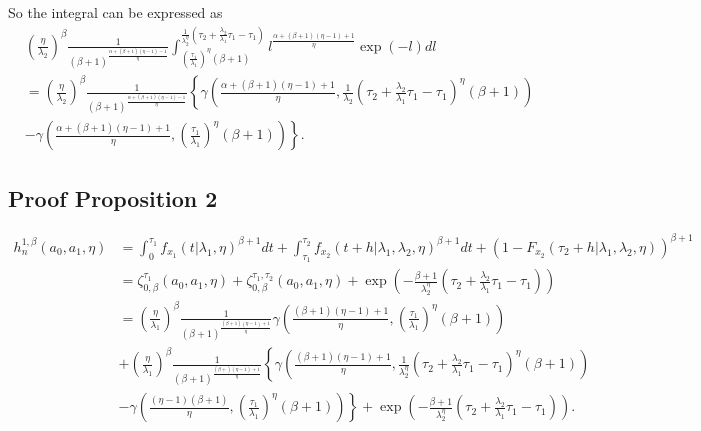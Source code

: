 \documentclass{article}
\begin{document}
So the integral can be expressed as
\begin{align*}
&\left(\frac{\eta}{\lambda_2}\right)^{\beta}\frac{1}{(\beta+1)^{\frac{\alpha+(\beta+1)(\eta-1)-1}{\eta}}}\int_{\left(\frac{\tau_1}{\lambda_1}\right)^{\eta}(\beta+1)}^{\frac{1}{\lambda_2^{\eta}}\left(\tau_2+\frac{\lambda_2}{\lambda_1}\tau_1-\tau_1\right)} l^{\frac{\alpha+(\beta+1)(\eta-1)+1}{\eta}}\exp\left(-l\right) dl 
\\
&=\left(\frac{\eta}{\lambda_2}\right)^{\beta}\frac{1}{(\beta+1)^{\frac{\alpha+(\beta+1)(\eta-1)-1}{\eta}}} \left\{ \gamma\left(\frac{\alpha+(\beta+1)(\eta-1)+1}{\eta},\frac{1}{\lambda_2}\left(\tau_2+\frac{\lambda_2}{\lambda_1}\tau_1-\tau_1\right) ^{\eta}(\beta+1)\right) \right.
\\
& \left.-\gamma\left(\frac{\alpha+(\beta+1)(\eta-1)+1}{\eta},\left(\frac{\tau_1}{\lambda_1}\right)^{\eta}(\beta+1)\right)\right\}.
\end{align*}

\subsection{Proof Proposition 2}
\begin{align*}
h_{n}^{1,\beta}(a_0,a_1,\eta)&=\int_0^{\tau_1}f_{x_1}\left(t|\lambda_1,\eta\right)^{\beta+1}dt+\int_{\tau_1}^{\tau_2}f_{x_2}\left(t+h|\lambda_1,\lambda_2,\eta\right)^{\beta+1}dt+\left(1- F_{x_2}\left(\tau_2+h|\lambda_1,\lambda_2,\eta\right)\right)^{\beta+1}
\\
&=\zeta_{0,\beta}^{\tau_1}(a_0,a_1,\eta)+\zeta_{0,\beta}^{\tau_1,\tau_2}(a_0,a_1,\eta)+\exp\left(-\frac{\beta+1}{\lambda_2^{\eta}}\left(\tau_2+\frac{\lambda_2}{\lambda_1}\tau_1-\tau_1\right)\right)
\\
&=\left(\frac{\eta}{\lambda_1}\right)^{\beta}\frac{1}{(\beta+1)^{\frac{(\beta+1)(\eta-1)+1}{\eta}}} \gamma\left(\frac{(\beta+1)(\eta-1)+1}{\eta}, \left(\frac{\tau_1}{\lambda_1}\right)^{\eta}(\beta+1)\right)
\\
&+\left(\frac{\eta}{\lambda_1}\right)^{\beta}\frac{1}{(\beta+1)^{\frac{(\beta+)(\eta-1)+1}{\eta}}}\left\{\gamma\left(\frac{(\beta+1)(\eta-1)+1}{\eta},\frac{1}{\lambda_2^{\eta}}\left(\tau_2+\frac{\lambda_2}{\lambda_1}\tau_1-\tau_1\right)^{\eta}(\beta+1)\right)\right.
\\
&-\left. \gamma\left(\frac{(\eta-1)(\beta+1)}{\eta},\left(\frac{\tau_1}{\lambda_1}\right)^{\eta}(\beta+1)\right) \right\}+\exp\left(-\frac{\beta+1}{\lambda_2^{\eta}}\left(\tau_2+\frac{\lambda_2}{\lambda_1}\tau_1-\tau_1\right)\right).
\end{align*}
\end{document}
